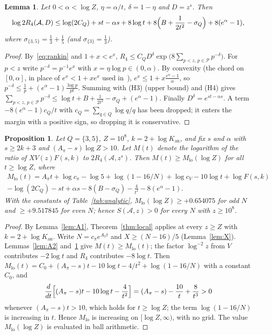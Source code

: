 \documentclass[preprint,11pt]{elsarticle}
\newtheorem{lemma}[theorem]{Lemma}
\newtheorem{proposition}[theorem]{Proposition}
\theoremstyle{definition}
\theoremstyle{remark}
\newcommand{\cA}{\mathcal{A}}
\newcommand{\cP}{\mathcal{P}}
\newcommand{\C}{\cite{Campbell2026}}
\numberwithin{equation}{section}
\begin{document}
\begin{lemma}\label{lem:A3}
Let $0<\alpha<\log Z$, $\eta=\alpha/t$, $\delta=1-\eta$ and $D=z^s$. Then
\[
  \log2R_4(\cA,D)\le\log(2C_Q)+st-\alpha s+8\log t
  +8\Bigl(B+\frac{1}{2t^2}-\sigma_Q\Bigr)+8(e^\alpha-1),
\]
where $\sigma_{\{3,5\}}=\frac13+\frac15$ (and $\sigma_{\{3\}}=\frac13$).
\end{lemma}

\begin{proof}
By~\eqref{eq:rankin} and $1+x<e^x$,
$R_4\le C_QD^\delta\exp\bigl(8\sum_{p<z,\,p\in\cP}p^{-\delta}\bigr)$. For
$p<z$ write $p^{-\delta}=p^{-1}e^x$ with $x=\eta\log p\in(0,\alpha)$. By
convexity (the chord on $[0,\alpha]$, in place of $e^x<1+xe^x$ used
in~\C), $e^x\le1+x\frac{e^\alpha-1}{\alpha}$, so
$p^{-\delta}\le\frac1p+(e^\alpha-1)\frac{\log p}{pt}$. Summing with (H3)
(upper bound) and (H4) gives
$\sum_{p<z,\,p\in\cP}p^{-\delta}\le\log t+B+\frac{1}{2t^2}-\sigma_Q+(e^\alpha-1)$.
Finally $D^\delta=e^{st-\alpha s}$. A term
$-8(e^\alpha-1)c_Q/t$ with $c_Q=\sum_{q\in Q}\log q/q$ has been dropped;
it enters the margin with a positive sign, so dropping it is conservative.
\end{proof}

\begin{proposition}\label{prop:analytic}
Let $Q=\{3,5\}$, $Z=10^8$,
$k=2+\log K_{\mathrm{an}}$, and fix $s$ and $\alpha$ with $s\ge2k+3$ and
$(A_\pi-s)\log Z>10$. Let $M(t)$ denote the logarithm of the ratio of
$XV(z)F(s,k)$ to $2R_4(\cA,z^s)$. Then $M(t)\ge M_{\mathrm{lo}}(\log Z)$ for
all $t\ge\log Z$, where
\begin{multline*}
  M_{\mathrm{lo}}(t)=A_\pi t+\log c_\pi-\log5+\log(1-16/N)+\log c_V-10\log t
  +\log F(s,k)\\-\log(2C_Q)-st+\alpha s-8(B-\sigma_Q)-\frac{4}{t^2}-8(e^\alpha-1).
\end{multline*}
With the constants of Table~\ref{tab:analytic},
$M_{\mathrm{lo}}(\log Z)\ge+0.654075$ for odd $N$ and $\ge+9.517845$ for
even $N$; hence $S(\cA,z)>0$ for every $N$ with $z\ge10^8$.
\end{proposition}

\begin{proof}
By Lemma~\ref{lem:A1}, Theorem~\ref{thm:local} applies at every $z\ge Z$ with
$k=2+\log K_{\mathrm{an}}$. Write $N=c_\pi e^{A_\pi t}$ and
$X\ge(N-16)/5$ (Lemma~\ref{lem:X}). Lemmas~\ref{lem:A2} and~\ref{lem:A3}
give $M(t)\ge M_{\mathrm{lo}}(t)$; the factor $\log^{-2}z$ from $V$
contributes $-2\log t$ and $R_4$ contributes $-8\log t$. Then
$M_{\mathrm{lo}}(t)=C_0+(A_\pi-s)t-10\log t-4/t^2+\log(1-16/N)$ with a
constant $C_0$, and
\[
  \frac{d}{dt}\Bigl[(A_\pi-s)t-10\log t-\frac{4}{t^2}\Bigr]
  =(A_\pi-s)-\frac{10}{t}+\frac{8}{t^3}>0
\]
whenever $(A_\pi-s)t>10$, which holds for $t\ge\log Z$; the term
$\log(1-16/N)$ is increasing in $t$. Hence $M_{\mathrm{lo}}$ is increasing
on $[\log Z,\infty)$, with no grid. The value $M_{\mathrm{lo}}(\log Z)$ is
evaluated in ball arithmetic.
\end{proof}
\end{document}
